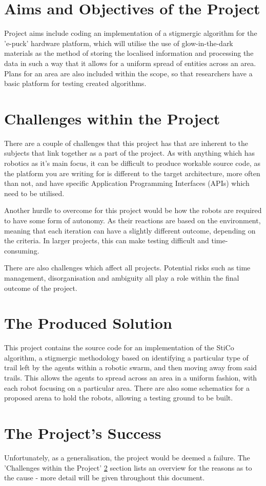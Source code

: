 \section{Aims and Objectives of the Project} \label{IntroAims}
Project aims include coding an implementation of a stigmergic algorithm for the
'e-puck' hardware platform, which will utilise the use of glow-in-the-dark
materials as the method of storing the localised information and processing the
data in such a way that it allows for a uniform spread of entities across an
area.  Plans for an area are also included within the scope, so that
researchers have a basic platform for testing created algorithms.

\section{Challenges within the Project} \label{IntroChallenges}
There are a couple of challenges that this project has that are inherent to the
subjects that link together as a part of the project.  As with anything which
has robotics as it's main focus, it can be difficult to produce workable source
code, as the platform you are writing for is different to the target
architecture, more often than not, and have specific Application Programming
Interfaces (APIs) which need to be utilised.

Another hurdle to overcome for this project would be how the robots are
required to have some form of autonomy.  As their reactions are based on the
environment, meaning that each iteration can have a slightly different outcome,
depending on the criteria.  In larger projects, this can make testing difficult
and time-consuming.

There are also challenges which affect all projects.  Potential risks such as
time management, disorganisation and ambiguity all play a role within the 
final outcome of the project.

\section{The Produced Solution} \label{IntroProducedSolution}
This project contains the source code for an implementation of the StiCo
algorithm, a stigmergic methodology based on identifying a particular type of
trail left by the agents within a robotic swarm, and then moving away from said
trails.  This allows the agents to spread across an area in a uniform fashion,
with each robot focusing on a particular area.  There are also some schematics
for a proposed arena to hold the robots, allowing a testing ground to be built.

\section{The Project's Success} \label{IntroSuccess}
Unfortunately, as a generalisation, the project would be deemed a failure.
The 'Challenges within the Project' \ref{IntroChallenges} section lists an
overview for the reasons as to the cause - more detail will be given throughout
this document.